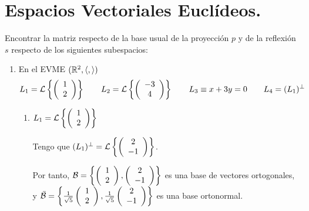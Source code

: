 \section{Espacios Vectoriales Euclídeos.}
\label{sec:EjerciciosTema3}
\begin{ejercicio} \label{Ejercicio1}
Encontrar la matriz respecto de la base usual de la proyección $p$ y de la reflexión $s$ respecto de los siguientes subespacios:
\begin{enumerate}
    \item En el EVME $(\mathbb{R}^2,\langle,\rangle)$
    \begin{equation*}
        L_1=\mathcal{L}\left\{\left(\begin{array}{c}
             1 \\ 2
        \end{array}\right)\right\}
        \qquad
        L_2=\mathcal{L}\left\{\left(\begin{array}{c}
             -3 \\ 4
        \end{array}\right)\right\}
        \qquad
        L_3 \equiv x+3y=0
        \qquad
        L_4=(L_1)^\perp
    \end{equation*}

    \begin{enumerate}
        \item $L_1=\mathcal{L}\left\{\left(\begin{array}{c}
             1 \\ 2
        \end{array}\right)\right\}$

        Tengo que $(L_1)^\perp=\mathcal{L}\left\{\left(\begin{array}{c}
             2 \\ -1
        \end{array}\right)\right\}$.

        Por tanto, $\mathcal{B}=\left\{\left(\begin{array}{c}
             1 \\ 2
        \end{array}\right), \left(\begin{array}{c}
             2 \\ -1
        \end{array}\right)\right\}$ es una base de vectores ortogonales, y 
        $\bar{\mathcal{B}}=\left\{\frac{1}{\sqrt{5}}\left(\begin{array}{c}
             1 \\ 2
        \end{array}\right), \frac{1}{\sqrt{5}}\left(\begin{array}{c}
             2 \\ -1
        \end{array}\right)\right\}$ es una base ortonormal.


\end{enumerate}
\end{enumerate}
\end{ejercicio}
